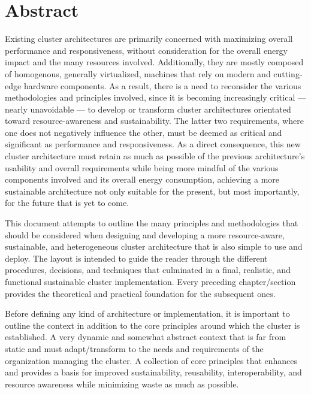 \chapter*{Abstract}
\label{abtract}


Existing cluster architectures are primarily concerned with maximizing overall
performance and responsiveness, without consideration for the overall energy impact
and the many resources involved. Additionally, they are mostly composed of homogenous,
generally virtualized, machines that rely on modern and cutting-edge hardware components.
As a result, there is a need to reconsider the various methodologies and principles
involved, since it is becoming increasingly critical --- nearly unavoidable ---
to develop or transform cluster architectures orientated toward resource-awareness
and sustainability. The latter two requirements, where one does not negatively
influence the other, must be deemed as critical and significant as performance and
responsiveness. As a direct consequence, this new cluster architecture must retain
as much as possible of the previous architecture's usability and overall requirements
while being more mindful of the various components involved and its overall energy
consumption, achieving a more sustainable architecture not only suitable for the
present, but most importantly, for the future that is yet to come.

This document attempts to outline the many principles and methodologies that
should be considered when designing and developing a more resource-aware, sustainable,
and heterogeneous cluster architecture that is also simple to use and deploy. The
layout is intended to guide the reader through the different procedures,
decisions, and techniques that culminated in a final, realistic, and functional sustainable
cluster implementation. Every preceding chapter/section provides the theoretical
and practical foundation for the subsequent ones.

Before defining any kind of architecture or implementation, it is important to outline
the context in addition to the core principles around which the cluster is established.
A very dynamic and somewhat abstract context that is far from static and must
adapt/transform to the needs and requirements of the organization managing the
cluster. A collection of core principles that enhances and provides a basis for improved
sustainability, reusability, interoperability, and resource awareness while
minimizing waste as much as possible.

